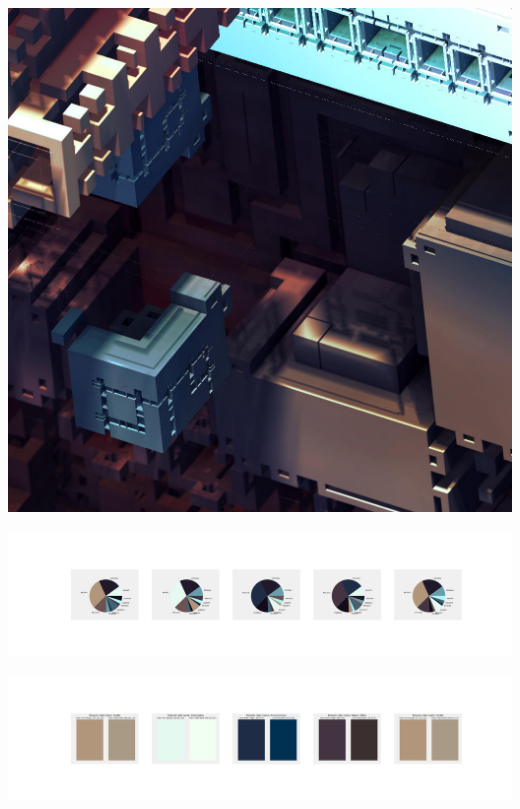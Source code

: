 \documentclass[11pt]{article}
\begin{document}
\begin{landscape}
    \begin{center}
    \includegraphics[width=\textwidth]{./nbimg/file (327).jpg}
    \end{center}

    \begin{center}
    \includegraphics[width=250mm]{./nbimg/pie-253.jpg}
    \end{center}

    \begin{center}
    \includegraphics[width=250mm]{./nbimg/peak-253.jpg}
    \end{center}
    


\end{landscape}
\end{document}
